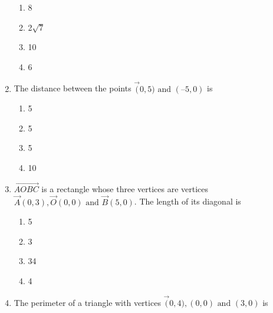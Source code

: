 \begin{enumerate}[label=\thesubsection.\arabic*,ref=\thesubsection.\theenumi]
\begin{enumerate}
\item 8
\item 2$\sqrt{7}$ 
\item 10
\item 6
\end{enumerate}
\item The distance between the points $\vec(0, 5)\text{ and }(–5, 0)$ is
\begin{enumerate}

\item 5
\item 5
\item 5
\item 10
\end{enumerate}
\item $\vec{AOBC}$ is a rectangle whose three vertices are vertices $\vec{A} (0, 3), \vec{O}(0, 0)\text{ and }
	\vec{B} (5, 0)$. The length of its diagonal is
\begin{enumerate}
\item 5
\item3
\item 34
\item 4
\end{enumerate}
\item The perimeter of a triangle with vertices $\vec(0, 4), (0, 0) \text{ and } (3, 0)$ is
\begin{enumerate}


\end{enumerate}
\end{enumerate}

